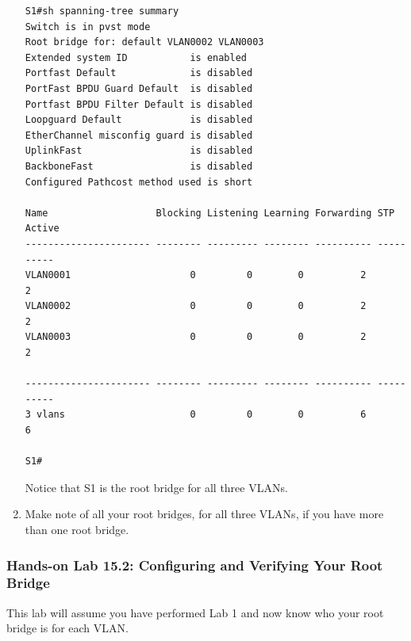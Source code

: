 \documentclass[b5paper,11pt]{memoir}
\begin{document}
\begin{enumerate}
\begin{verbatim}
S1#sh spanning-tree summary
Switch is in pvst mode
Root bridge for: default VLAN0002 VLAN0003
Extended system ID           is enabled
Portfast Default             is disabled
PortFast BPDU Guard Default  is disabled
Portfast BPDU Filter Default is disabled
Loopguard Default            is disabled
EtherChannel misconfig guard is disabled
UplinkFast                   is disabled
BackboneFast                 is disabled
Configured Pathcost method used is short
 
Name                   Blocking Listening Learning Forwarding STP Active
---------------------- -------- --------- -------- ---------- ----------
VLAN0001                     0         0        0          2          2
VLAN0002                     0         0        0          2          2
VLAN0003                     0         0        0          2          2
 
---------------------- -------- --------- -------- ---------- ----------
3 vlans                      0         0        0          6          6
 
S1#
\end{verbatim}

  Notice that S1 is the root bridge for all three VLANs.
\item
  Make note of all your root bridges, for all three VLANs, if you have
  more than one root bridge.
\end{enumerate}

\subsubsection[Hands-on Lab 15.2: Configuring and Verifying Your Root
Bridge]{\texorpdfstring{\protect\hypertarget{c15.xhtmlux5cux23c15-sec-26}{}{}Hands-on
Lab 15.2: Configuring and Verifying Your Root
Bridge}{Hands-on Lab 15.2: Configuring and Verifying Your Root Bridge}}

This lab will assume you have performed Lab 1 and now know who your root
bridge is for each VLAN.
\end{document}

